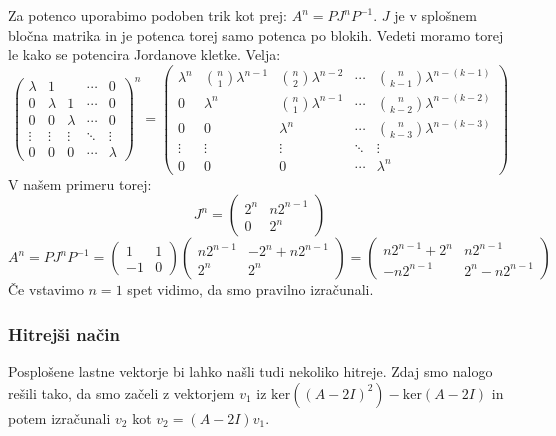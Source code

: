 \documentclass{article}
\begin{document}
Za potenco uporabimo podoben trik kot prej: $A^n = P J^n P^{-1}$.
$J$ je v splošnem bločna matrika in je potenca torej samo potenca po blokih. Vedeti moramo torej le kako se potencira Jordanove kletke. Velja:
\begin{equation*}
\begin{pmatrix}
\lambda & 1 &  & \cdots & 0 \\
0 & \lambda & 1 & \cdots & 0 \\
0 & 0 & \lambda & \cdots & 0 \\
\vdots & \vdots & \vdots & \ddots & \vdots \\
0 & 0 & 0 & \cdots & \lambda
\end{pmatrix}^n
 = 
\begin{pmatrix}
\lambda^n & \binom{n}{1} \lambda^{n-1} & \binom{n}{2} \lambda^{n-2} & \cdots & \binom{n}{k-1} \lambda^{n-(k-1)} \\
0 & \lambda^n & \binom{n}{1} \lambda^{n-1} & \cdots & \binom{n}{k-2} \lambda^{n-(k-2)} \\
0 & 0 & \lambda^n & \cdots & \binom{n}{k-3} \lambda^{n-(k-3)} \\
\vdots & \vdots & \vdots & \ddots & \vdots \\
0 & 0 & 0 & \cdots & \lambda^n
\end{pmatrix}
\end{equation*}
V našem primeru torej:
\begin{equation*}
J^n = \begin{pmatrix}
2^n & n 2^{n-1} \\
0 & 2^n
\end{pmatrix}
\end{equation*}
\begin{equation*}
A^n = P J^n P^{-1} =
 \begin{pmatrix} 
1 & 1 \\
-1 & 0
\end{pmatrix}
 \begin{pmatrix} 
n 2^{n-1} & -2^n + n 2^{n-1} \\
2^n & 2^n
\end{pmatrix}
= \begin{pmatrix}
n2^{n-1} + 2^n & n 2^{n-1} \\
-n 2^{n-1} & 2^n -n2^{n-1}
\end{pmatrix}
\end{equation*}
Če vstavimo $n=1$ spet vidimo, da smo pravilno izračunali.

\subsubsection*{Hitrejši način}
Posplošene lastne vektorje bi lahko našli tudi nekoliko hitreje.
Zdaj smo nalogo rešili tako, da smo začeli z vektorjem $v_1$ iz $\mathrm{ker}((A-2I)^2) - \mathrm{ker}(A-2I)$ in potem izračunali $v_2$ kot $v_2 = (A-2I)v_1$.
\end{document}
